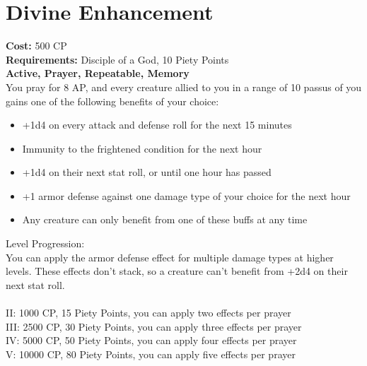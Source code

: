 \section{Divine Enhancement}
\textbf{Cost:} 500 CP\\
\textbf{Requirements:} Disciple of a God, 10 Piety Points \\
\textbf{Active, Prayer, Repeatable, Memory}\\
You pray for 8 AP, and every creature allied to you in a range of 10 passus of you gains one of the following benefits of your choice:
\begin{itemize}
	\item +1d4 on every attack and defense roll for the next 15 minutes
	\item Immunity to the frightened condition for the next hour
	\item +1d4 on their next stat roll, or until one hour has passed
	\item +1 armor defense against one damage type of your choice for the next hour
	\item Any creature can only benefit from one of these buffs at any time
\end{itemize}

Level Progression:\\
You can apply the armor defense effect for multiple damage types at higher levels. These effects don't stack, so a creature can't benefit from +2d4 on their next stat roll.\\
\\
II: 1000 CP, 15 Piety Points, you can apply two effects per prayer\\
III: 2500 CP, 30 Piety Points, you can apply three effects per prayer\\
IV: 5000 CP, 50 Piety Points, you can apply four effects per prayer\\
V: 10000 CP, 80 Piety Points, you can apply five effects per prayer\\